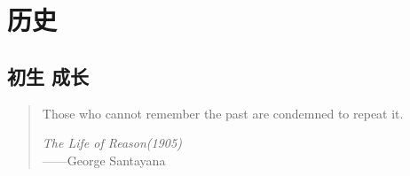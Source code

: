 \documentclass[compress]{beamer}
\begin{document}
\section{历史}

\subsection{初生 成长}

\begin{frame}
\begin{quotation}
Those who cannot remember the past are condemned to repeat it.
\begin{flushright}{\itshape The Life of Reason(1905)}\\[-0.5ex]------George Santayana\end{flushright}
\end{quotation}
\end{frame}
\end{document}
